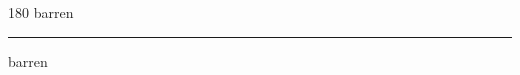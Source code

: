 
\begin{frame}
\begin{center}
\begin{turn}{180}
{\fontsize{2.5cm}{1em}\selectfont barren}
\end{turn}
\vspace{1em}\par  
\hrule
\vspace{1em}\par  
{\fontsize{2.5cm}{1em}\selectfont barren}
\end{center}
\end{frame}
